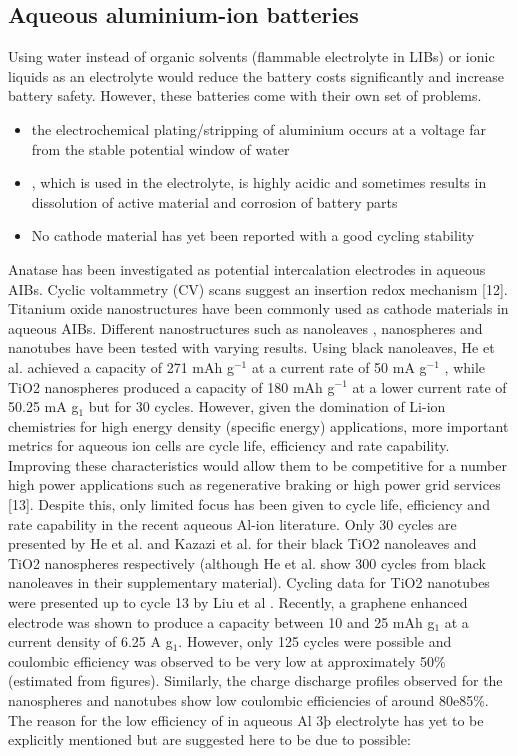 \subsection{Aqueous aluminium-ion batteries}
Using water instead of organic solvents (flammable electrolyte in LIBs) or ionic liquids as an electrolyte would reduce the battery costs significantly and increase battery safety.
However, these batteries come with their own set of problems. 
\begin{itemize}
    \item the electrochemical plating/stripping of aluminium occurs at a
    voltage far from the stable potential window of water
    \item {}, which is used in the electrolyte, is highly acidic and sometimes results in dissolution of active material and corrosion of battery parts
    \item No cathode material has yet been reported with a good cycling stability 
\end{itemize}  
  Anatase  has been investigated as potential intercalation electrodes in aqueous AIBs. Cyclic voltammetry (CV) scans suggest an insertion redox mechanism [12]. Titanium oxide nanostructures have been commonly used as cathode materials in aqueous AIBs. Different nanostructures such as nanoleaves \cite{}, nanospheres\cite{} and nanotubes\cite{} have been tested with varying results. Using black  nanoleaves, He et al. achieved a capacity of 271 mAh g$^{-1}$ at a current rate of 50 mA g$^{-1}$ , while TiO2 nanospheres produced a capacity of 180 mAh g$^{-1}$ at a lower current rate of 50.25 mA g$_1$ but for 30 cycles. However, given the domination of Li-ion chemistries for high energy density (specific energy) applications, more important metrics for aqueous ion cells are cycle life, efficiency and rate capability. Improving these characteristics would allow them to be competitive for a number high power applications such as regenerative braking or high power grid services [13]. Despite this, only limited focus has been given to cycle life, efficiency and rate capability in the recent aqueous Al-ion literature. Only 30 cycles are presented by He et al. and Kazazi et al. for their black TiO2 nanoleaves and TiO2 nanospheres respectively (although He et al. show 300 cycles from black nanoleaves in their supplementary material)\cite{kazazi_high_2017}. Cycling data for TiO2 nanotubes were presented up to cycle 13 by Liu et al \cite{liu_aluminum_2012}.  Recently, a graphene enhanced  electrode was shown to produce a capacity between 10 and 25 mAh g$_1$ at a current density of 6.25 A g$_1$. However, only 125 cycles were possible and coulombic efficiency was observed to be very low at approximately 50\% (estimated from figures). Similarly, the charge discharge profiles observed for the nanospheres and nanotubes show low coulombic efficiencies of around 80e85\%. The reason for the low efficiency of  in aqueous Al 3þ electrolyte has yet to be explicitly mentioned but are suggested here to be due to possible:
